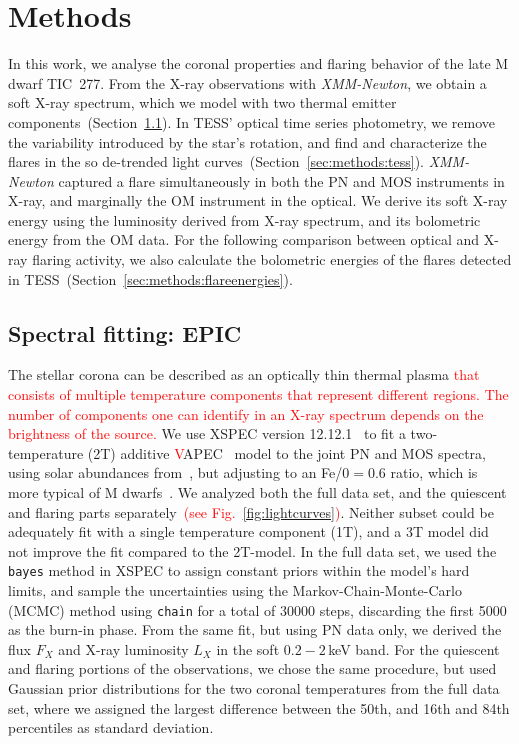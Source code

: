 \documentclass[twocolumn]{aastex631}
\begin{document}
\section{Methods}
\label{sec:methods}
In this work, we analyse the coronal properties and flaring behavior of the late M dwarf TIC~277. From the X-ray observations with \textit{XMM-Newton}, we obtain a soft X-ray spectrum, which we model with two thermal emitter components~(Section~\ref{sec:methods:epic}). In TESS' optical time series photometry, we remove the variability introduced by the star's rotation, and find and characterize the flares in the so de-trended light curves~(Section~\ref{sec:methods:tess}). \textit{XMM-Newton} captured a flare simultaneously in both the PN and MOS instruments in X-ray, and marginally the OM instrument in the optical. We derive its soft X-ray energy using the luminosity derived from X-ray spectrum, and its bolometric energy from the OM data. For the following comparison between optical and X-ray flaring activity, we also calculate the bolometric energies of the flares detected in TESS~(Section~\ref{sec:methods:flareenergies}). 

\subsection{Spectral fitting: EPIC}
\label{sec:methods:epic}
The stellar corona can be described as an optically thin thermal plasma \textcolor{red}{that consists of multiple temperature components that represent different regions. The number of components one can identify in an X-ray spectrum depends on the brightness of the source.} We use XSPEC version 12.12.1~\citep{arnaud1996xspec} to fit a two-temperature (2T) additive \textcolor{red}{V}APEC~\citep{smith2001collisional,foster2012updated} model to the joint PN and MOS spectra, using solar abundances from~\citet{grevesse1998standard}, but adjusting to an Fe/0$=0.6$ ratio, which is more typical of M dwarfs~\citep{wood2018chandra}. We analyzed both the full data set, and the quiescent and flaring parts separately~\textcolor{red}{(see Fig.~\ref{fig:lightcurves})}. Neither subset could be adequately fit with a single temperature component (1T), and a 3T model did not improve the fit compared to the 2T-model. In the full data set, we used the \texttt{bayes} method in XSPEC to assign constant priors within the model's hard limits, and sample the uncertainties using the Markov-Chain-Monte-Carlo (MCMC) method using \texttt{chain} for a total of 30000 steps, discarding the first 5000 as the burn-in phase. From the same fit, but using PN data only, we derived the flux $F_X$ and X-ray luminosity $L_X$ in the soft $0.2-2\,$keV band. For the quiescent and flaring portions of the observations, we chose the same procedure, but used Gaussian prior distributions for the two coronal temperatures from the full data set, where we assigned the largest difference between the 50th, and 16th and 84th percentiles as standard deviation.
\end{document}
